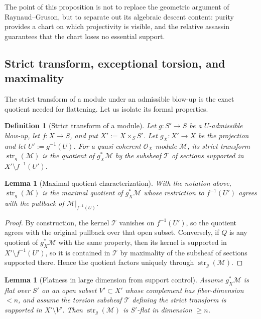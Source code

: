 \documentclass[11pt,oneside]{article}
\newtheorem{lemma}[theorem]{Lemma}
\newtheorem{definition}[theorem]{Definition}
\newcommand{\M}{\mathcal M}
\newcommand{\OO}{\mathcal O}
\newcommand{\Tcal}{\mathcal T}
\newcommand{\st}{\operatorname{str}}
\begin{document}
The point of this proposition is not to replace the geometric argument of Raynaud--Gruson, but to separate out its algebraic descent content: purity provides a chart on which projectivity is visible, and the relative assassin guarantees that the chart loses no essential support.

\subsection{Strict transform, exceptional torsion, and maximality}

The strict transform of a module under an admissible blow-up is the exact quotient needed for flattening.  Let us isolate its formal properties.

\begin{definition}[Strict transform of a module]
Let $g\colon S'\to S$ be a $U$-admissible blow-up, let $f\colon X\to S$, and put $X':=X\times_S S'$.  Let $g_X\colon X'\to X$ be the projection and let $U':=g^{-1}(U)$.  For a quasi-coherent $\OO_X$-module $\M$, its strict transform $\st_g(\M)$ is the quotient of $g_X^*\M$ by the subsheaf $\Tcal$ of sections supported in $X'\setminus f^{-1}(U')$.
\end{definition}

\begin{lemma}[Maximal quotient characterization]\label{lem:strict-maximal}
With the notation above, $\st_g(\M)$ is the maximal quotient of $g_X^*\M$ whose restriction to $f^{-1}(U')$ agrees with the pullback of $\M|_{f^{-1}(U)}$.
\end{lemma}

\begin{proof}
By construction, the kernel $\Tcal$ vanishes on $f^{-1}(U')$, so the quotient agrees with the original pullback over that open subset.  Conversely, if $Q$ is any quotient of $g_X^*\M$ with the same property, then its kernel is supported in $X'\setminus f^{-1}(U')$, so it is contained in $\Tcal$ by maximality of the subsheaf of sections supported there.  Hence the quotient factors uniquely through $\st_g(\M)$.
\end{proof}

\begin{lemma}[Flatness in large dimension from support control]\label{lem:strict-flat-codim}
Assume $g_X^*\M$ is flat over $S'$ on an open subset $V'\subset X'$ whose complement has fiber-dimension $<n$, and assume the torsion subsheaf $\Tcal$ defining the strict transform is supported in $X'\setminus V'$.  Then $\st_g(\M)$ is $S'$-flat in dimension $\ge n$.
\end{lemma}
\end{document}
